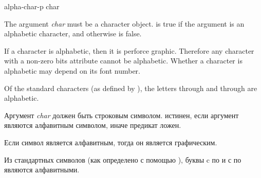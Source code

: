 \begin{defun}[Function]
alpha-char-p char

The argument \emph{char} must be a character object.
 is true if the argument is an alphabetic
character, and otherwise is false.

If a character is alphabetic, then it is perforce graphic.
Therefore any character with a non-zero bits attribute cannot be alphabetic.
Whether a character is alphabetic may depend on its font number.

Of the standard characters (as defined by ),
the letters  through  and  through  are alphabetic.

Аргумент \emph{char} должен быть строковым символом.
 истинен, если аргумент являются алфавитным символом, иначе
предикат ложен.

Если символ является алфавитным, тогда он является графическим.

Из стандартных символов (как определено с помощью ), буквы
c  по  и с  по  являются алфавитными.
\end{defun}

